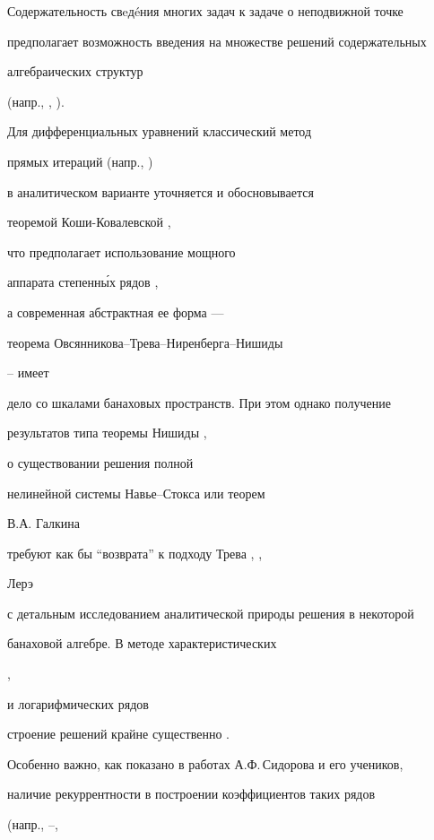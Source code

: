 \label{begin}





Содержательность свeд\'eния многих задач к задаче о неподвижной точке


предполагает возможность введения на множестве решений содержательных


алгебраических структур


(напр., \cite{VasinSidorov},  \cite{BMN}).





Для дифференциальных уравнений классический метод


прямых итераций (напр., \cite{10})


в аналитическом варианте уточняется и обосновывается


теоремой Коши-Ковалевской \cite{KK},


что предполагает использование мощного


аппарата степенн\'ых рядов \cite{5},


а современная абстрактная ее форма ---


теорема Овсянникова--Трева--Ниренберга--Нишиды


\cite{8}--\cite{7} имеет


дело со шкалами банаховых пространств. При этом однако получение


результатов типа теоремы Нишиды \cite{3}, \cite{4}


о существовании решения полной


нелинейной системы Навье--Стокса или теорем


В.А. Галкина \cite{GalkinVA}


требуют как бы ``возврата'' к подходу Трева \cite{11}, \cite{12},


Лерэ \cite{Leray}


с детальным исследованием аналитической природы решения в некоторой


банаховой алгебре. В методе характеристических


\cite{VasinSidorov}, \cite{F17}


и логарифмических \cite{F19} рядов


строение решений крайне существенно \cite{Fuchs}.


Особенно важно, как показано в работах А.Ф.\,Сидорова и его учеников,


наличие рекуррентности в построении коэффициентов таких рядов


(напр., \cite{SidorovAF1975}--\cite{TitovDU},



